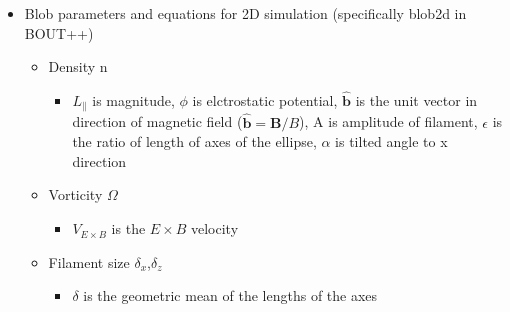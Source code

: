 \documentclass{article}
\begin{document}
\begin{itemize}
\begin{itemize}
    \end{itemize}
    \item Blob parameters and equations for 2D simulation (specifically blob2d in BOUT++) \cite{omotani_effects_2015}
    \begin{itemize}
        \item Density n
         \begin{itemize}
            \item $L_{\parallel}$ is magnitude, $\phi$ is elctrostatic potential, $\bm{\hat{b}}$ is the unit vector in direction of magnetic field ($\bm{\hat{b}}=\bm{B}/B$), A is amplitude of filament, $\epsilon$ is the ratio of length of axes of the ellipse, $\alpha$ is tilted angle to x direction
        \end{itemize}
        \item Vorticity $\Omega$
            \begin{itemize}
            \item $V_{E\times B}$ is the $E\times B$ velocity
            \end{itemize}
        \item Filament size $\delta_x$,$\delta_z$
            \begin{itemize}
            \item $\delta$ is the geometric mean of the lengths of the axes
            \end{itemize}

\end{itemize}
\end{itemize}
\end{document}
